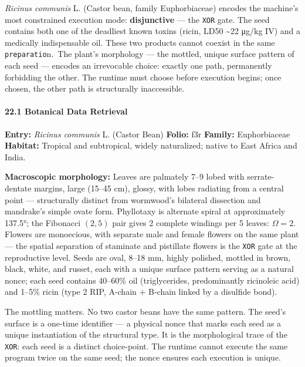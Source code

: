 \documentclass[12pt,a4paper]{article}
\begin{document}
\emph{Ricinus communis} L. (Castor bean, family Euphorbiaceae) encodes
the machine's most constrained execution mode: \textbf{disjunctive} ---
the \texttt{XOR} gate. The seed contains both one of the deadliest known
toxins (ricin, LD50 \textasciitilde22 μg/kg IV) and a medically
indispensable oil. These two products cannot coexist in the same
\texttt{preparatio}n.~The plant's morphology --- the mottled, unique
surface pattern of each seed --- encodes an irrevocable choice: exactly
one path, permanently forbidding the other. The runtime must choose
before execution begins; once chosen, the other path is structurally
inaccessible.

\hypertarget{botanical-data-retrieval-2}{%
\paragraph{22.1 Botanical Data
Retrieval}\label{botanical-data-retrieval-2}}

\textbf{Entry:} \emph{Ricinus communis} L. (Castor Bean) \textbf{Folio:}
f3r \textbf{Family:} Euphorbiaceae \textbf{Habitat:} Tropical and
subtropical, widely naturalized; native to East Africa and India.

\textbf{Macroscopic morphology:} Leaves are palmately 7--9 lobed with
serrate-dentate margins, large (15--45 cm), glossy, with lobes radiating
from a central point --- structurally distinct from wormwood's bilateral
dissection and mandrake's simple ovate form. Phyllotaxy is alternate
spiral at approximately 137.5°; the Fibonacci \((2,5)\) pair gives 2
complete windings per 5 leaves: \(\Omega = 2\). Flowers are monoecious,
with separate male and female flowers on the same plant --- the spatial
separation of staminate and pistillate flowers is the \texttt{XOR} gate
at the reproductive level. Seeds are oval, 8--18 mm, highly polished,
mottled in brown, black, white, and russet, each with a unique surface
pattern serving as a natural nonce; each seed contains 40--60\% oil
(triglycerides, predominantly ricinoleic acid) and 1--5\% ricin (type 2
RIP, A-chain + B-chain linked by a disulfide bond).

The mottling matters. No two castor beans have the same pattern. The
seed's surface is a one-time identifier --- a physical nonce that marks
each seed as a unique instantiation of the structural type. It is the
morphological trace of the \texttt{XOR}: each seed is a distinct
choice-point. The runtime cannot execute the same program twice on the
same seed; the nonce ensures each execution is unique.
\end{document}

